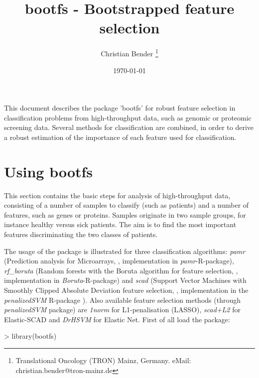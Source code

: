 \documentclass[11pt,a4paper]{article}
\begin{document}
\title{bootfs - Bootstrapped feature selection}
\author{ Christian Bender \footnote{Translational Oncology (TRON) Mainz, Germany. eMail: christian.bender@tron-mainz.de} }
\date{\today}
\maketitle



This document describes the package 'bootfs' for robust feature selection in classification problems from high-throughput data, such as genomic or proteomic screening data. Several methods for classification are combined, in order to derive a robust estimation of the importance of each feature used for classification.

\section{Using bootfs}
\label{sec:quickstart}

This section contains the basic steps for analysis of high-throughput data, consisting of a number of samples to classify (such as patients) and a number of features, such as genes or proteins. Samples originate in two sample groups, for instance healthy versus sick patients. The aim is to find the most important features discriminating the two classes of patients.

The usage of the package is illustrated for three classification algorithms: \emph{pamr} (Prediction analysis for Microarrays, \cite{Tibshirani2002}, implementation in \emph{pamr}-R-package), \emph{rf\_boruta} (Random forests with the Boruta algorithm for feature selection, \cite{Kursa2010}, implementation in \emph{Boruta}-R-package) and \emph{scad} (Support Vector Machines with Smoothly Clipped Absolute Deviation feature selection, \cite{Zhang2006}, implementation in the \emph{penalizedSVM} R-package \cite{Becker2011}). Also available feature selection methods (through \emph{penalizedSVM} package) are \emph{1norm} for L1-penalisation (LASSO), \emph{scad+L2} for Elastic-SCAD  and \emph{DrHSVM} for Elastic Net. First of all load the package:

\begin{Schunk}
\begin{Sinput}
> library(bootfs)
\end{Sinput}
\end{Schunk}
\end{document}
